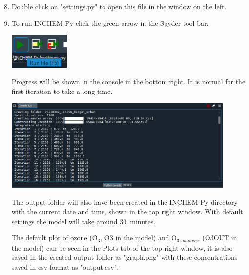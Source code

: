 \documentclass[a4paper]{refart}
\begin{document}
\newpage
{\hspace*{-\leftmarginwidth}
\begin{minipage}{\fullwidth}
\linespread{2.0}\selectfont
\begin{enumerate}
\setcounter{enumi}{7}
    \item Double click on "settings.py" to open this file in the window on the left.
    \item To run INCHEM-Py click the green arrow in the Spyder tool bar.
                
            \vspace{1em}
            \begin{minipage}[t]{\linewidth}
                \centering
                \includegraphics[width = 3cm]{run.png}
            \end{minipage}
          
          Progress will be shown in the console in the bottom right. It is normal for the first iteration to take a long time.
          
            \vspace{1em}
            \begin{minipage}[t]{\linewidth}
                \centering
                \includegraphics[width = 0.9\textwidth]{progress.png}
            \end{minipage}
            
          The output folder will also have been created in the INCHEM-Py directory with the current date and time, shown in the top right window. With default settings the model will take around 30~minutes.
          
          The default plot of ozone (O$_3$, O3 in the model) and O$_{3,outdoors}$ (O3OUT in the model) can be seen in the Plots tab of the top right window, it is also saved in the created output folder as "graph.png" with these concentrations saved in csv format as "output.csv".
                    

\end{enumerate}
\end{minipage}}
\end{document}

